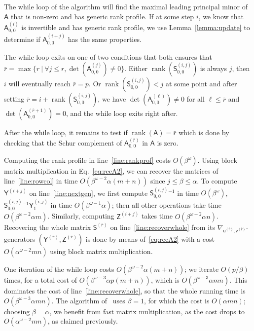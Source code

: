 \documentclass{sig-alternate}
\newcommand{\vu}{\ensuremath{\mathsf{u}}}
\newcommand{\vv}{\ensuremath{\mathsf{v}}}
\newcommand{\mA}{\ensuremath{\mathsf{A}}}
\newcommand{\mS}{\ensuremath{\mathsf{S}}}
\newcommand{\mY}{\ensuremath{\mathsf{Y}}}
\newcommand{\mZ}{\ensuremath{\mathsf{Z}}}
\newcommand{\rank}{\ensuremath{\operatorname{rank}}}
\begin{document}
The while loop of the algorithm will find the maximal leading
principal minor of $\mA$ that is non-zero and has generic rank
profile. If at some step $i$, we know that $\mA^{(i)}_{0,0}$ is
invertible and has generic rank profile, we use
Lemma~\ref{lemma:update} to determine if $\mA^{(i+j)}_{0,0}$ has the
same properties.

The while loop exits on one of two conditions that both ensures that
$\bar{r} = \max\{ r \ |\ \forall j \leq r, \det(\mA^{(j)}_{0,0}) \neq
0 \}$.
Either $\rank(\mS^{(i,j)}_{0,0})$ is always $j$, then $i$ will
eventually reach $\bar{r}=p$. Or $\rank(\mS^{(i,j)}_{0,0})<j$ at some
point and after setting $\bar{r}=i+\rank( \mS^{(i,j)}_{0,0})$, we
have $\det(\mA^{(\ell)}_{0,0}) \neq 0$ for all $\ell \leq \bar{r}$
and $\det(\mA^{(\bar{r}+1)}_{0,0}) = 0$, and the while loop exits
right after.

After the while loop, it remains to test if $\rank(\mA) = \bar{r}$
which is done by checking that the Schur complement of
$\mA^{(\bar{r})}_{0,0}$ in $\mA$ is zero.

\smallskip{} Computing the rank profile
in line~\ref{line:rankprof} costs $O(\beta^\omega)$.  Using block
matrix multiplication in Eq.~\eqref{eq:recA2}, we can recover the
matrices of line~\ref{line:rowcol} in time
$O(\beta^{\omega-2} \alpha (m+n))$ since $j \le \beta \le \alpha$.  To
compute $\mY^{(i+j)}$ on line~\ref{line:nextgen}, we first compute
$\mS^{(i,j)}_{0,0}{}^{-1}$ in time $O(\beta^{\omega})$,
$\mS^{(i,j)}_{0,0}{}^{-1} \mY^{(i,j)}_1$ in time
$O(\beta^{\omega-1} \alpha)$; then all other operations take time
$O(\beta^{\omega-2} \alpha m)$.  Similarly, computing $\mZ^{(i+j)}$
takes time $O(\beta^{\omega-2} \alpha n)$.  Recovering the whole
matrix $\mS^{(\bar{r})}$ on line~\ref{line:recoverwhole} from its
$\nabla_{\vu^{(\bar{r})},\vv^{(\bar{r})}}$-generators
$(\mY^{(\bar{r})},\mZ^{(\bar{r})})$ is done by means
of~\eqref{eq:recA2} with a cost $O(\alpha^{\omega-2} mn)$ using block
matrix multiplication.

One iteration of the while loop costs
$O(\beta^{\omega-2} \alpha (m+n))$; we iterate $O(p/\beta)$ times, for
a total cost of $O(\beta^{\omega-3} \alpha p(m+n))$, which is
$O(\beta^{\omega-3} \alpha mn)$. This dominates the cost of
line~\ref{line:recoverwhole}, so that the whole running time is
$O(\beta^{\omega-3} \alpha mn)$. The algorithm of~\cite{Mouilleron08}
uses $\beta=1$, for which the cost is $O(\alpha mn)$; choosing
$\beta=\alpha$, we benefit from fast matrix multiplication, as the
cost drops to $O(\alpha^{\omega-2} mn)$, as claimed previously.
\end{document}
